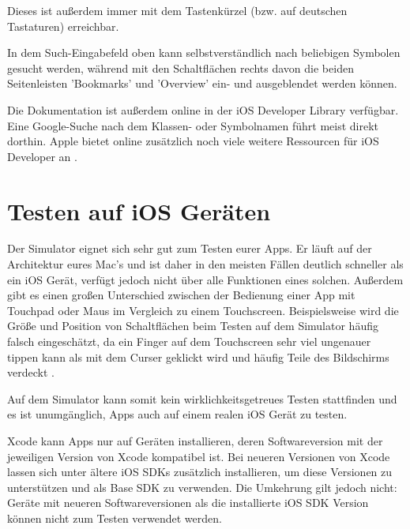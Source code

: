 \documentclass[parskip=half, final]{scrreprt}
\begin{document}
Dieses ist außerdem immer mit dem Tastenkürzel  (bzw.  auf deutschen Tastaturen) erreichbar.

In dem Such-Eingabefeld oben kann selbstverständlich nach beliebigen Symbolen gesucht werden, während mit den Schaltflächen rechts davon die beiden Seitenleisten 'Bookmarks' und 'Overview' ein- und ausgeblendet werden können.


Die Dokumentation ist außerdem online in der iOS Developer Library  verfügbar. Eine Google-Suche nach dem Klassen- oder Symbolnamen führt meist direkt dorthin. Apple bietet online zusätzlich noch viele weitere Ressourcen für iOS Developer an .

\section{Testen auf iOS Geräten}\label{sec:testondevice}

Der Simulator eignet sich sehr gut zum Testen eurer Apps. Er läuft auf der Architektur eures Mac's und ist daher in den meisten Fällen deutlich schneller als ein iOS Gerät, verfügt jedoch nicht über alle Funktionen eines solchen. Außerdem gibt es einen großen Unterschied zwischen der Bedienung einer App mit Touchpad oder Maus im Vergleich zu einem Touchscreen. Beispielsweise wird die Größe und Position von Schaltflächen beim Testen auf dem Simulator häufig falsch eingeschätzt, da ein Finger auf dem Touchscreen sehr viel ungenauer tippen kann als mit dem Curser geklickt wird und häufig Teile des Bildschirms verdeckt .


Auf dem Simulator kann somit kein wirklichkeitsgetreues Testen stattfinden und es ist unumgänglich, Apps auch auf einem realen iOS Gerät zu testen.

Xcode kann Apps nur auf Geräten installieren, deren Softwareversion mit der jeweiligen Version von Xcode kompatibel ist. Bei neueren Versionen von Xcode lassen sich unter  ältere iOS SDKs zusätzlich installieren, um diese Versionen zu unterstützen und als Base SDK  zu verwenden. Die Umkehrung gilt jedoch nicht: Geräte mit neueren Softwareversionen als die installierte iOS SDK Version können nicht zum Testen verwendet werden.
\end{document}

